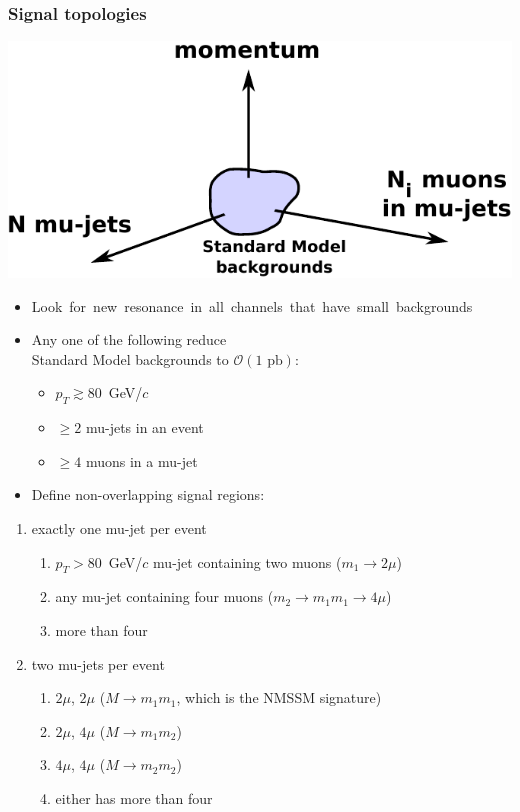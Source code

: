 \documentclass[compress]{beamer}
\begin{document}
\begin{frame}
\frametitle{Signal topologies}

\vspace{1 cm}
\hfill \includegraphics[width=0.5\linewidth]{signal_regions.pdf}

\vspace{-3.5 cm}
\begin{itemize}
\item \mbox{Look for new resonance in all channels that have small backgrounds\hspace{-0.5 cm}}

\item Any one of the following reduce \\ Standard Model backgrounds to $\mathcal{O}(1\mbox{ pb})$:
\begin{itemize}
\item $p_T \gtrsim 80$~GeV/$c$
\item $\ge 2$ mu-jets in an event
\item $\ge 4$ muons in a mu-jet
\end{itemize}
\item Define non-overlapping signal regions:
\end{itemize}

\vspace{-0.5 cm}
\begin{center}
\begin{minipage}{0.8\linewidth}
\scriptsize
\begin{enumerate}
\item exactly one mu-jet per event
\begin{enumerate}
\item \scriptsize $p_T > 80$~GeV/$c$ mu-jet containing two muons \mbox{($m_1 \to 2\mu$)\hspace{-1 cm}}
\item \scriptsize any mu-jet containing four muons ($m_2 \to m_1 m_1 \to 4\mu$)
\item \scriptsize more than four
\end{enumerate}

\item two mu-jets per event
\begin{enumerate}
\item \scriptsize $2\mu$, $2\mu$ ($M \to m_1 m_1$, which is the NMSSM signature)
\item \scriptsize $2\mu$, $4\mu$ ($M \to m_1 m_2$)
\item \scriptsize $4\mu$, $4\mu$ ($M \to m_2 m_2$)
\item \scriptsize either has more than four
\end{enumerate}


\end{enumerate}
\end{minipage}
\end{center}
\end{frame}
\end{document}
